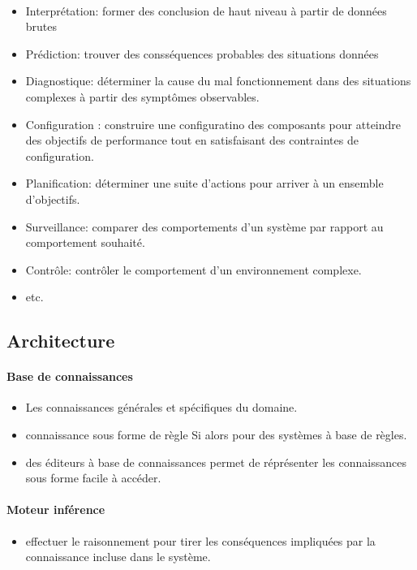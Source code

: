 \documentclass{article}
\begin{document}
\paragraph{}
\begin{itemize}
	\item Interprétation: former des conclusion de haut niveau à partir de données brutes
	\item Prédiction: trouver des consséquences probables des situations données
	\item Diagnostique: déterminer la cause du mal fonctionnement dans des situations complexes à partir des symptômes observables.
	\item Configuration : construire une configuratino des composants pour atteindre des objectifs de performance tout en satisfaisant des contraintes de configuration.
	\item Planification: déterminer une suite d'actions pour arriver à un ensemble d'objectifs.
	\item Surveillance: comparer des comportements d'un système par rapport au comportement souhaité.
	\item Contrôle: contrôler le comportement d'un environnement complexe.
	\item etc.
\end{itemize}

\newpage

\subsection{Architecture}

\paragraph{Base de connaissances}
\begin{itemize}
	\item Les connaissances générales et spécifiques du domaine.
	\item connaissance sous forme de règle Si alors pour des systèmes à base de règles.
	\item des éditeurs à base de connaissances permet de réprésenter les connaissances sous forme facile à accéder.
\end{itemize}

\paragraph{Moteur inférence}
\begin{itemize}
	\item effectuer le raisonnement pour tirer les conséquences impliquées par la connaissance incluse dans le système.
\end{itemize}
\end{document}
